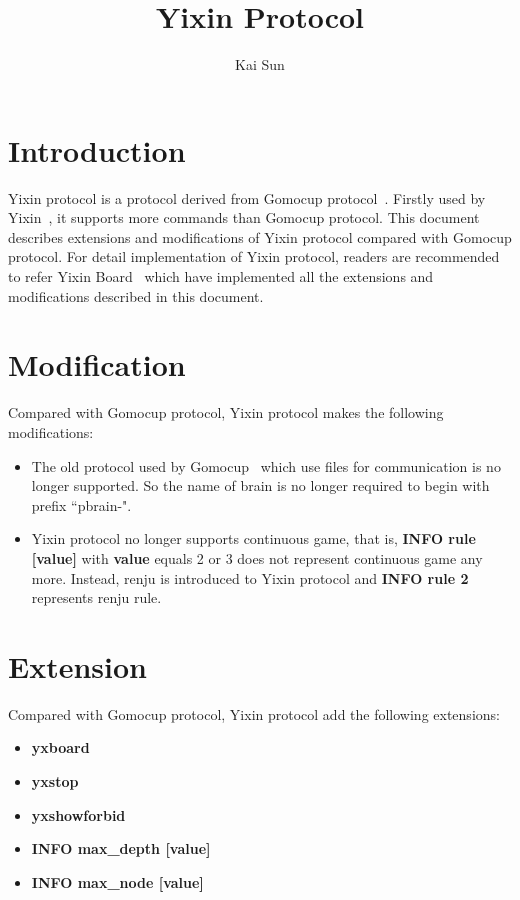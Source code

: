 \documentclass[a4paper,12pt]{article}
\begin{document}
\newtheorem{theorem}{Theorem}[section]
\newtheorem{lemma}{Lemma}[section]
\newtheorem{definition}{Definition}[section]
\newtheorem*{myproof}{Proof}
\newtheorem*{myexercise}{Exercise}
\newtheorem*{myproblem}{Problem}
\author{Kai Sun}
\title{Yixin Protocol}
\maketitle

\section{Introduction}
Yixin protocol is a protocol derived from Gomocup protocol~\cite{gomocup-protocol}. Firstly used by Yixin~\cite{yixin}, it supports more commands than Gomocup protocol. This document describes extensions and modifications of Yixin protocol compared with Gomocup protocol. For detail implementation of Yixin protocol, readers are recommended to refer Yixin Board~\cite{yixin-board} which have implemented all the extensions and modifications described in this document.

\section{Modification}
Compared with Gomocup protocol, Yixin protocol makes the following modifications:
\begin{itemize}
\item The old protocol used by Gomocup~\cite{old-gomocup-protocol} which use files for communication is no longer supported. So the name of brain is no longer required to begin with prefix ``pbrain-".
\item Yixin protocol no longer supports continuous game, that is, \textbf{INFO rule [value]} with \textbf{value} equals 2 or 3 does not represent continuous game any more. Instead, renju is introduced to Yixin protocol and \textbf{INFO rule 2} represents renju rule.
\end{itemize}
\section{Extension}
Compared with Gomocup protocol, Yixin protocol add the following extensions:
\begin{itemize}
\item \textbf{yxboard}
\item \textbf{yxstop}
\item \textbf{yxshowforbid}
\item \textbf{INFO max\_depth [value]}
\item \textbf{INFO max\_node [value]}
\end{itemize}



\end{document}
